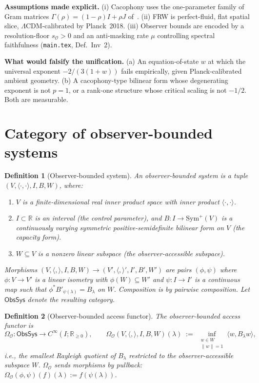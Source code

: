 \documentclass[11pt]{article}
\newtheorem{definition}{Definition}
\newcommand{\Obs}{\mathcal{O}}
\newcommand{\OmegaO}{\Omega_{\Obs}}
\newcommand{\rmin}{s_{\Obs}}
\newcommand{\Real}{\mathbb{R}}
\newcommand{\ObsSys}{\mathsf{ObsSys}}
\newcommand{\Sym}{\mathrm{Sym}}
\begin{document}
\noindent\textbf{Assumptions made explicit.}
(i) Cacophony uses the one-parameter family of Gram matrices
$\Gamma(\rho) = (1 - \rho) I + \rho J$ of~\cite{tiffany2026cacophony}.
(ii) FRW is perfect-fluid, flat spatial slice, $\Lambda$CDM-calibrated
by Planck~2018. (iii) Observer bounds are encoded by a
resolution-floor $\rmin > 0$ and an anti-masking rate $\mu$
controlling spectral faithfulness
(\texttt{main.tex}, Def.~Inv~2).

\noindent\textbf{What would falsify the unification.}
(a) An equation-of-state $w$ at which the universal exponent
$-2/(3(1+w))$ fails empirically, given Planck-calibrated ambient
geometry. (b) A cacophony-type bilinear form whose degenerating
exponent is not $p = 1$, or a rank-one structure whose critical
scaling is not $-1/2$. Both are measurable.

\section{Category of observer-bounded systems}
\label{sec:obsys}

\begin{definition}[Observer-bounded system]
\label{def:obsys}
An \emph{observer-bounded system} is a tuple
$(V, \langle\cdot,\cdot\rangle, I, B, W)$, where:
\begin{enumerate}[label=(\alph*),leftmargin=*,itemsep=2pt]
\item $V$ is a finite-dimensional real inner product space with
inner product $\langle\cdot,\cdot\rangle$.
\item $I \subset \Real$ is an interval (the \emph{control
parameter}), and $B: I \to \Sym^+(V)$ is a continuously
varying symmetric positive-semidefinite bilinear form on $V$
(the \emph{capacity form}).
\item $W \subseteq V$ is a nonzero linear subspace (the
\emph{observer-accessible subspace}).
\end{enumerate}
Morphisms $(V, \langle,\rangle, I, B, W) \to
(V', \langle,\rangle', I', B', W')$ are pairs $(\phi, \psi)$ where
$\phi: V \to V'$ is a linear isometry with $\phi(W) \subseteq W'$
and $\psi: I \to I'$ is a continuous map such that
$\phi^* B'_{\psi(\lambda)} = B_\lambda$ on $W$. Composition is
by pairwise composition. Let $\ObsSys$ denote the resulting
category.
\end{definition}

\begin{definition}[Observer-bounded access functor]
\label{def:accessor}
The \emph{observer-bounded access functor} is
\[
\OmegaO: \ObsSys \to C^\infty(I; \Real_{\geq 0}),
\qquad
\OmegaO(V, \langle,\rangle, I, B, W)(\lambda) \;:=\;
\inf_{\substack{w \in W \\ \|w\| = 1}}
\langle w, B_\lambda w \rangle,
\]
i.e., the smallest Rayleigh quotient of $B_\lambda$ restricted
to the observer-accessible subspace $W$. $\OmegaO$ sends
morphisms by pullback: $\OmegaO(\phi, \psi)(f)(\lambda) :=
f(\psi(\lambda))$.
\end{definition}
\end{document}
